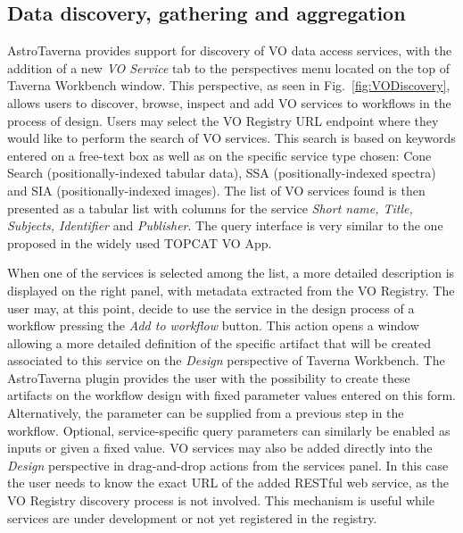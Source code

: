 \documentclass[final,authoryear,5p,times,twocolumn]{elsarticle}
\begin{document}
\subsection{Data discovery, gathering and aggregation}
\label{DataDiscovery}

AstroTaverna provides support for discovery of VO data access services, with the addition of a new \textit{VO Service} tab to the perspectives menu located on the top of Taverna Workbench window. This perspective, as seen in Fig.~\ref{fig:VODiscovery}, allows users to discover, browse, inspect and add VO services to workflows in the process of design. Users may select the VO Registry URL endpoint where they would like to perform the search of VO services. This search is based on keywords entered on a free-text box as well as on the specific service type chosen: Cone Search (positionally-indexed tabular data), SSA (positionally-indexed spectra) and SIA (positionally-indexed images). The list of VO services found is then presented as a tabular list with columns for the service \textit{Short name, Title, Subjects, Identifier} and \textit{Publisher}. The query interface is very similar to the one proposed in the widely used TOPCAT VO App. 

When one of the services is selected among the list, a more detailed description is displayed on the right panel, with metadata extracted from the VO Registry. The user may, at this point, decide to use the service in the design process of a workflow pressing the \textit{Add to workflow} button. This action opens a window allowing a more detailed definition of the specific artifact that will be created associated to this service on the \emph{Design} perspective of Taverna Workbench. The AstroTaverna plugin provides the user with the possibility to create these artifacts on the workflow design with fixed parameter values entered on this form. Alternatively, the parameter can be supplied from a previous step in the workflow. Optional, service-specific query parameters can similarly be enabled as inputs or given a fixed value. VO services may also be added directly into the \emph{Design} perspective in drag-and-drop actions from the services panel. In this case the user needs to know the exact URL of the added RESTful web service, as the VO Registry discovery process is not involved. This mechanism is useful while services are under development or not yet registered in the registry.
\end{document}
